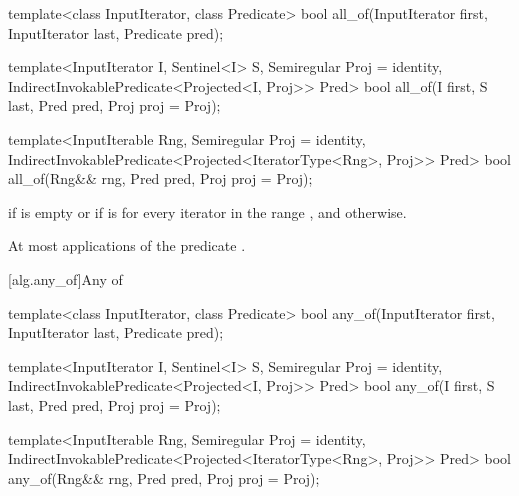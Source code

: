 %
\begin{removedblock}
\begin{itemdecl}
template<class InputIterator, class Predicate>
  bool all_of(InputIterator first, InputIterator last, Predicate pred);
\end{itemdecl}
\end{removedblock}
\begin{addedblock}
\begin{itemdecl}
template<InputIterator I, Sentinel<I> S, Semiregular Proj = identity,
    IndirectInvokablePredicate<Projected<I, Proj>> Pred>
  bool all_of(I first, S last, Pred pred, Proj proj = Proj{});

template<InputIterable Rng, Semiregular Proj = identity,
    IndirectInvokablePredicate<Projected<IteratorType<Rng>, Proj>> Pred>
  bool all_of(Rng&& rng, Pred pred, Proj proj = Proj{});
\end{itemdecl}
\end{addedblock}

\begin{itemdescr}
\pnum
\returns {} if
 is empty or if
is  for every iterator  in the range ,
and  otherwise.

\pnum
\complexity At most  applications of the predicate
.
\end{itemdescr}

[alg.any_of]{Any of}

%
\begin{removedblock}
\begin{itemdecl}
template<class InputIterator, class Predicate>
  bool any_of(InputIterator first, InputIterator last, Predicate pred);
\end{itemdecl}
\end{removedblock}
\begin{addedblock}
\begin{itemdecl}
template<InputIterator I, Sentinel<I> S, Semiregular Proj = identity,
    IndirectInvokablePredicate<Projected<I, Proj>> Pred>
  bool any_of(I first, S last, Pred pred, Proj proj = Proj{});

template<InputIterable Rng, Semiregular Proj = identity,
    IndirectInvokablePredicate<Projected<IteratorType<Rng>, Proj>> Pred>
  bool any_of(Rng&& rng, Pred pred, Proj proj = Proj{});
\end{itemdecl}
\end{addedblock}

